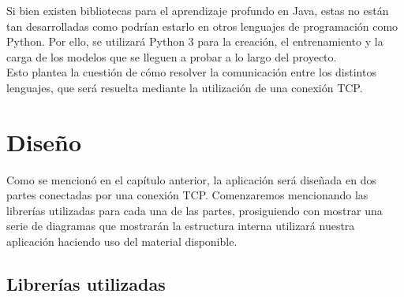 Si bien existen bibliotecas para el aprendizaje profundo en Java, estas no están tan desarrolladas como podrían estarlo en otros lenguajes de programación como Python. Por ello, se utilizará Python 3 para la creación, el entrenamiento y la carga de los modelos que se lleguen a probar a lo largo del proyecto.\\

Esto plantea la cuestión de cómo resolver la comunicación entre los distintos lenguajes, que será resuelta mediante la utilización de una conexión TCP.\\
\chapter{Diseño}

Como se mencionó en el capítulo anterior, la aplicación será diseñada en dos partes conectadas por una conexión TCP. Comenzaremos mencionando las librerías utilizadas para cada una de las partes, prosiguiendo con mostrar una serie de diagramas que mostrarán la estructura interna utilizará nuestra aplicación haciendo uso del material disponible.

\section{Librerías utilizadas}

